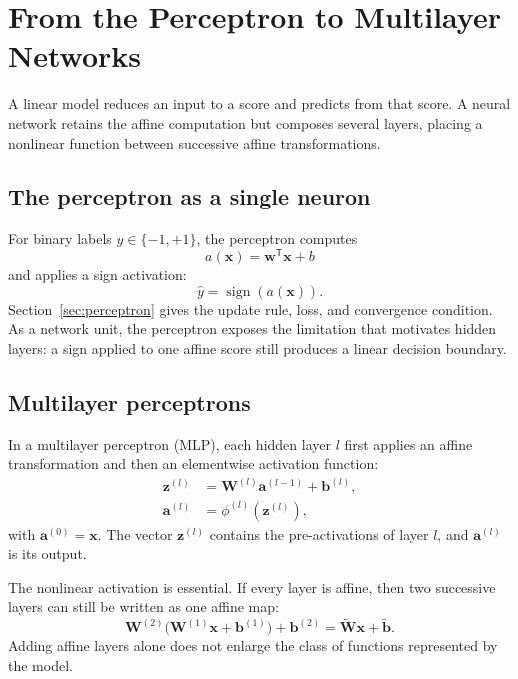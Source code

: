 

\section{From the Perceptron to Multilayer Networks}
\label{sec:mlp}

A linear model reduces an input to a score and predicts from that score. A neural network retains the affine computation but composes several layers, placing a nonlinear function between successive affine transformations.

\subsection{The perceptron as a single neuron}

For binary labels $y\in\{-1,+1\}$, the perceptron computes
\[
    a(\mathbf{x})=\mathbf{w}^{\mathsf T}\mathbf{x}+b
\]
and applies a sign activation:
\[
    \widehat{y}=\operatorname{sign}\!\left(a(\mathbf{x})\right).
\]
Section~\ref{sec:perceptron} gives the update rule, loss, and convergence
condition. As a network unit, the perceptron exposes the limitation that
motivates hidden layers: a sign applied to one affine score still produces a
linear decision boundary.

\subsection{Multilayer perceptrons}

In a multilayer perceptron (MLP), each hidden layer \(l\) first applies an affine transformation and then an elementwise activation function:
\begin{align}
    \mathbf{z}^{(l)}
    &=\mathbf{W}^{(l)}\mathbf{a}^{(l-1)}+\mathbf{b}^{(l)},
    \label{eq:mlp-affine}\\
    \mathbf{a}^{(l)}
    &=\phi^{(l)}\!\left(\mathbf{z}^{(l)}\right),
    \label{eq:mlp-activation}
\end{align}
with \(\mathbf{a}^{(0)}=\mathbf{x}\). The vector \(\mathbf{z}^{(l)}\) contains the pre-activations of layer \(l\), and \(\mathbf{a}^{(l)}\) is its output.

The nonlinear activation is essential. If every layer is affine, then two successive layers can still be written as one affine map:
\[
    \mathbf{W}^{(2)}
    \bigl(\mathbf{W}^{(1)}\mathbf{x}+\mathbf{b}^{(1)}\bigr)
    +\mathbf{b}^{(2)}
    =\widetilde{\mathbf{W}}\mathbf{x}+\widetilde{\mathbf{b}}.
\]
Adding affine layers alone does not enlarge the class of functions represented by the model.

